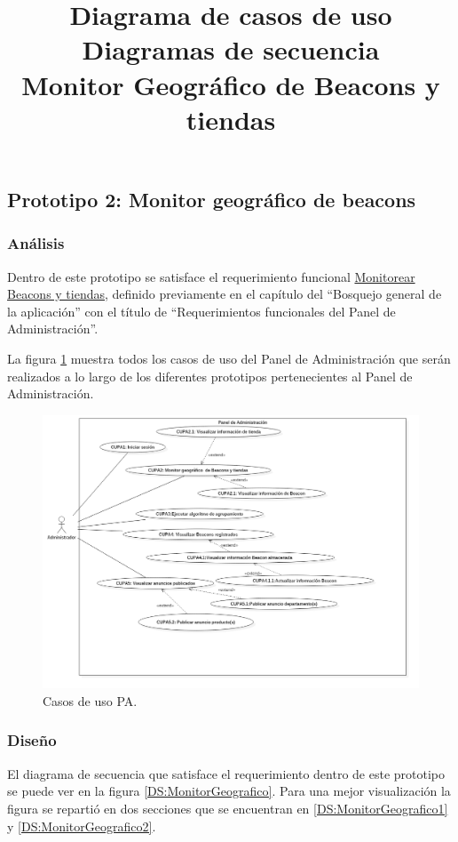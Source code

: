 \subsection{Prototipo 2: Monitor geográfico de beacons}

\subsubsection{Análisis}

Dentro de este prototipo se satisface el requerimiento funcional \hyperlink{RFPA}{Monitorear Beacons y tiendas}, definido previamente en el capítulo del ``Bosquejo general de la aplicación''  con el título de ``Requerimientos funcionales del Panel de Administración''. \\ \par

\FloatBarrier

\title{\textbf{Diagrama de casos de uso \\}}
La figura \ref{casosdeusoPA} muestra todos los casos de uso del Panel de Administración que serán realizados a lo largo de los diferentes prototipos pertenecientes al Panel de Administración.
\FloatBarrier
\begin{figure}[htbp!]
		\centering
			\includegraphics[width=1.1 \textwidth]{imagenes/CU/middleware}
		\caption{Casos de uso PA.}
		\label{casosdeusoPA}
\end{figure}
\FloatBarrier

\subsubsection{Diseño}
\title{\textbf{Diagramas de secuencia} \\}
El diagrama de secuencia que satisface el requerimiento dentro de este prototipo se puede ver en la figura \ref{DS:MonitorGeografico}. Para una mejor visualización la figura se repartió en dos secciones que se encuentran en \ref{DS:MonitorGeografico1} y \ref{DS:MonitorGeografico2}. \\
\title{\textbf{Monitor Geográfico de Beacons y tiendas}}

